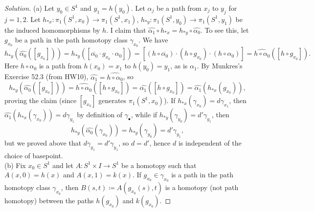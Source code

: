 \documentclass[10pt]{article}
\providecommand{\ol}{\overline}
\newenvironment{soln}{\begin{proof}[Solution]}{\end{proof}}
\begin{document}
\begin{soln}
    (a) Let $y_0\in S^1$ and $y_1 = h(y_0)$.
    Let $\alpha_j$ be a path from $x_j$ to $y_j$ for $j=1,2$.
    Let $h_{*x}\colon\pi_1(S^1,x_0)\to\pi_1(S^1,x_1)$,
    $h_{*y}\colon\pi_1(S^1,y_0)\to\pi_1(S^1,y_1)$ be
    the induced homomorphisms by $h$.
    I claim that $\widehat{\alpha_1}\circ h_{*x} = h_{*y}\circ\widehat{\alpha_0}$.
    To see this, let $g_{x_0}$ be a path in the path homotopy class $\gamma_{x_0}$.
    We have
    \begin{equation*}
	h_{*y}(\widehat{\alpha_0}([g_{x_0}]))
	= h_{*y}([\ol{\alpha_0}\cdot g_{x_0}\cdot \alpha_0])
	= [(h\circ\ol{\alpha_0})\cdot(h\circ g_{x_0})\cdot(h\circ\alpha_0)]
	= \widehat{h\circ\alpha_0}([h\circ g_{x_0}]).
    \end{equation*}
    Here $h\circ\alpha_0$ is a path from $h(x_0) = x_1$ to $h(y_0) = y_1$,
    as is $\alpha_1$. By Munkres's Exercise 52.3 (from HW10),
    $\widehat{\alpha_1} = \widehat{h\circ\alpha_0}$, so
    \begin{equation*}
	h_{*y}(\widehat{\alpha_0}([g_{x_0}]))
	= \widehat{h\circ\alpha_0}([h\circ g_{x_0}])
	= \widehat{\alpha_1}([h\circ g_{x_0}])
	= \widehat{\alpha_1}(h_{*x}(g_{x_0})),
    \end{equation*}
    proving the claim (since $[g_{x_0}]$ generates $\pi_1(S^1,x_0)$).
    If $h_{*x}(\gamma_{x_0}) = d\gamma_{x_1}$, then
    $\widehat{\alpha_1}(h_{*x}(\gamma_{x_0})) = d\gamma_{y_1}$ by definition
    of $\gamma_\bullet$, while
    if $h_{*y}(\gamma_{y_0}) = d'\gamma_{y_1}$, then
    \begin{equation*}
	h_{*y}(\widehat{\alpha_0}(\gamma_{x_0}))
	= h_{*y}(\gamma_{y_0})
	= d'\gamma_{y_1},
    \end{equation*}
    but we proved above that $d\gamma_{y_1} = d'\gamma_{y_1}$,
    so $d = d'$, hence $d$ is independent of the choice of basepoint.
    \\

    (b) Fix $x_0\in S^1$ and let $A\colon S^1\times I\to S^1$ be a homotopy
    such that $A(x,0) = h(x)$ and $A(x,1) = k(x)$.
    If $g_{x_0}\in\gamma_{x_0}$ is a path in the path homotopy class $\gamma_{x_0}$,
    then $B(s,t)\coloneq A(g_{x_0}(s),t)$ is a homotopy (not path homotopy)
    between the paths $h(g_{x_0})$ and $k(g_{x_0})$.


\end{soln}
\end{document}
